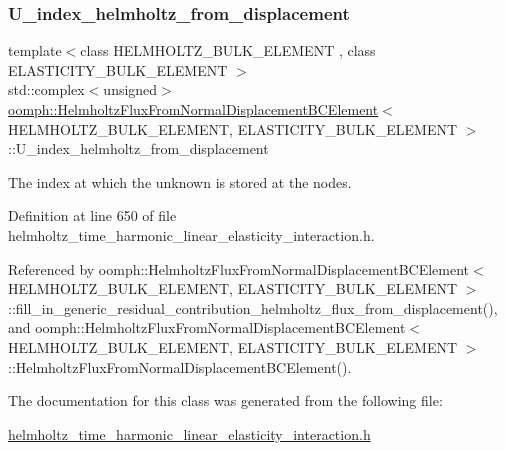 \subsubsection{\texorpdfstring{U\+\_\+index\+\_\+helmholtz\+\_\+from\+\_\+displacement}{U\_index\_helmholtz\_from\_displacement}}
{\footnotesize\ttfamily template$<$class H\+E\+L\+M\+H\+O\+L\+T\+Z\+\_\+\+B\+U\+L\+K\+\_\+\+E\+L\+E\+M\+E\+NT , class E\+L\+A\+S\+T\+I\+C\+I\+T\+Y\+\_\+\+B\+U\+L\+K\+\_\+\+E\+L\+E\+M\+E\+NT $>$ \\
std\+::complex$<$unsigned$>$ \hyperlink{classoomph_1_1HelmholtzFluxFromNormalDisplacementBCElement}{oomph\+::\+Helmholtz\+Flux\+From\+Normal\+Displacement\+B\+C\+Element}$<$ H\+E\+L\+M\+H\+O\+L\+T\+Z\+\_\+\+B\+U\+L\+K\+\_\+\+E\+L\+E\+M\+E\+NT, E\+L\+A\+S\+T\+I\+C\+I\+T\+Y\+\_\+\+B\+U\+L\+K\+\_\+\+E\+L\+E\+M\+E\+NT $>$\+::U\+\_\+index\+\_\+helmholtz\+\_\+from\+\_\+displacement\hspace{0.3cm}{\ttfamily [private]}}



The index at which the unknown is stored at the nodes. 



Definition at line 650 of file helmholtz\+\_\+time\+\_\+harmonic\+\_\+linear\+\_\+elasticity\+\_\+interaction.\+h.



Referenced by oomph\+::\+Helmholtz\+Flux\+From\+Normal\+Displacement\+B\+C\+Element$<$ H\+E\+L\+M\+H\+O\+L\+T\+Z\+\_\+\+B\+U\+L\+K\+\_\+\+E\+L\+E\+M\+E\+N\+T, E\+L\+A\+S\+T\+I\+C\+I\+T\+Y\+\_\+\+B\+U\+L\+K\+\_\+\+E\+L\+E\+M\+E\+N\+T $>$\+::fill\+\_\+in\+\_\+generic\+\_\+residual\+\_\+contribution\+\_\+helmholtz\+\_\+flux\+\_\+from\+\_\+displacement(), and oomph\+::\+Helmholtz\+Flux\+From\+Normal\+Displacement\+B\+C\+Element$<$ H\+E\+L\+M\+H\+O\+L\+T\+Z\+\_\+\+B\+U\+L\+K\+\_\+\+E\+L\+E\+M\+E\+N\+T, E\+L\+A\+S\+T\+I\+C\+I\+T\+Y\+\_\+\+B\+U\+L\+K\+\_\+\+E\+L\+E\+M\+E\+N\+T $>$\+::\+Helmholtz\+Flux\+From\+Normal\+Displacement\+B\+C\+Element().



The documentation for this class was generated from the following file\+:\begin{DoxyCompactItemize}
\item 
\hyperlink{helmholtz__time__harmonic__linear__elasticity__interaction_8h}{helmholtz\+\_\+time\+\_\+harmonic\+\_\+linear\+\_\+elasticity\+\_\+interaction.\+h}\end{DoxyCompactItemize}
